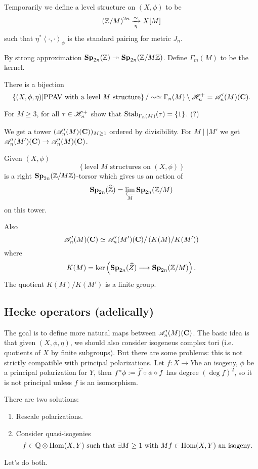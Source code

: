 \begin{definition}
	Temporarily we define a level structure on $(X,\phi)$ to be
	\[
		(\mathbb Z /M)^{2n} \xrightarrow[\eta]{\sim} X[M]
	\] 
	such that $\eta^{*}\left<\cdot ,\cdot  \right>_\phi$ is the standard pairing for metric $J_n$.
\end{definition}
\begin{fact}
	By strong approximation $\mathbf{Sp}_{2n}(\mathbb Z)\twoheadrightarrow \mathbf{Sp}_{2n}(\mathbb Z /M\mathbb Z)$. Define $\Gamma_m(M)$ to be the kernel.
\end{fact}
\begin{corollary}
	There is a bijection
	\[
		\left\{ (X,\phi,\eta) \middle| \text{PPAV with a level }M\text{ structure} \right\} / \sim \simeq \Gamma_n(M) \setminus \mathscr H_n^{+} = \mathscr{A}_n'(M)(\mathbf{C}).
	\] 
\end{corollary}
\begin{exercise}
	For $M\ge 3$, for all $\tau\in \mathscr H_n^{+}$ show that $\operatorname{Stab}_{\Gamma_n(M)}(\tau) = \{1\}$. (?)
\end{exercise}
We get a tower $(\mathscr{A}'_n(M)(\mathbf{C}))_{M\ge 1}$ ordered by divisibility. For $M \mid |M'$ we get $\CA_n'(M')(\bb{C})\to \CA_n'(M)(\bb{C})$.

Given $(X,\phi)$ 
\[
\left\{ \text{level }M\text{ structures on }(X,\phi) \right\} 
\] 
is a right $\mathbf{Sp}_{2n}(\mathbb Z /M\mathbb Z)$-torsor which gives us an action of
\[
	\mathbf{Sp}_{2n}(\widehat{\mathbb Z}) = \varprojlim_M \mathbf{Sp}_{2n}(\mathbb Z /M)
\] 
on this tower.

Also
\[
	\mathscr{A}_n'(M)(\mathbf{C}) \simeq \mathscr{A}'_n(M')(\mathbf{C}) /\left( K(M) /K(M') \right) 
\] 
where 
\[
	K(M) = \ker\left( \Sp_{2n}(\wh{Z}) \to \Sp_{2n}(\Z /M) \right) .
\] 
The quotient $K(M) /K(M')$ is a finite group.

\subsection{Hecke operators (adelically)}
The goal is to define more natural maps between $\mathscr{A}_n'(M)(\mathbf{C})$. The basic idea is that given $(X,\phi,\eta)$, we should also consider isogeneus complex tori (i.e. quotients of $X$ by finite subgroups). But there are some problems: this is not strictly compatible with principal polarizations. Let $f:X\to Y$be an isogeny, $\phi$ be a principal polarization for $Y$, then $f^{*}\phi:= \widehat{f}\circ \phi \circ f$ has degree $(\deg f)^2$, so it is not principal unless $f$ is an isomorphism.

There are two solutions:
\begin{enumerate}[1)]
	\item Rescale polarizations.
	\item Consider quasi-isogenies 
		\[
			f\in \mathbb Q\otimes\operatorname{Hom}(X,Y) \text{ such that }\exists M\ge 1 \text{ with } Mf\in \operatorname{Hom}(X,Y) \text{ an isogeny}.
		\]
\end{enumerate}
Let's do both.

